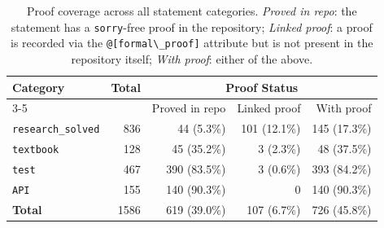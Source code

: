 \begin{table}[t!]
  \caption{Proof coverage across all statement categories. \emph{Proved in repo}: the statement has a \lstinline{sorry}-free proof in the repository; \emph{Linked proof}: a proof is recorded via the \lstinline{@[formal\_proof]} attribute but is not present in the repository itself; \emph{With proof}: either of the above.}
  \label{tab:formal_proof_baseline}
  \centering
  \begin{tabular}{lrrrr}
    \toprule
    Category & Total & \multicolumn{3}{c}{Proof Status} \\
    \cmidrule(lr){3-5}
    & & Proved in repo & Linked proof & With proof \\
    \midrule
    \texttt{research\_solved} & 836 & 44 (5.3\%) & 101 (12.1\%) & 145 (17.3\%) \\
    \texttt{textbook} & 128 & 45 (35.2\%) & 3 (2.3\%) & 48 (37.5\%) \\
    \texttt{test} & 467 & 390 (83.5\%) & 3 (0.6\%) & 393 (84.2\%) \\
    \texttt{API} & 155 & 140 (90.3\%) & 0 & 140 (90.3\%) \\
    \midrule
    \textbf{Total} & 1586 & 619 (39.0\%) & 107 (6.7\%) & 726 (45.8\%) \\
    \bottomrule
  \end{tabular}
\end{table}

